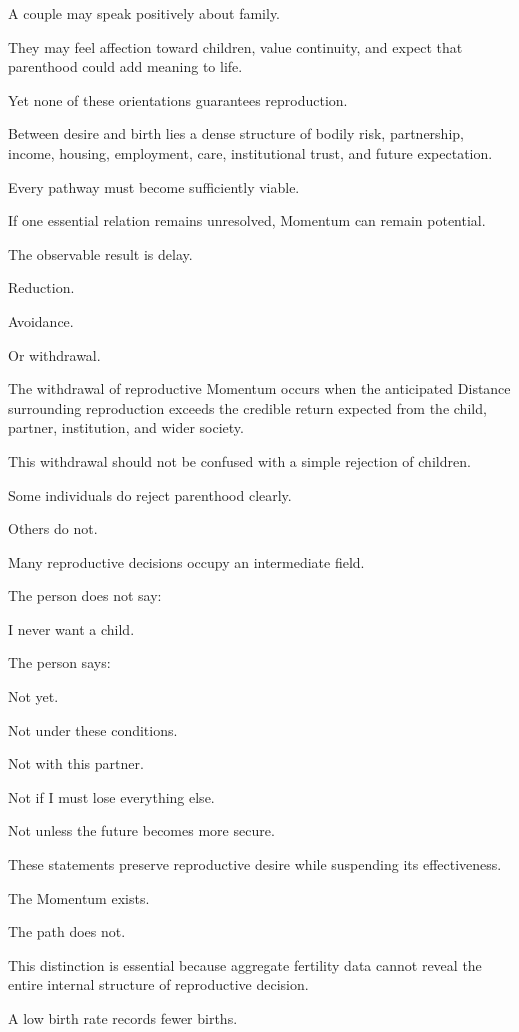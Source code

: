 A couple may speak positively about family.

They may feel affection toward children, value continuity, and expect that parenthood could add meaning to life.

Yet none of these orientations guarantees reproduction.

Between desire and birth lies a dense structure of bodily risk, partnership, income, housing, employment, care, institutional trust, and future expectation.

Every pathway must become sufficiently viable.

If one essential relation remains unresolved, Momentum can remain potential.

The observable result is delay.

Reduction.

Avoidance.

Or withdrawal.

The withdrawal of reproductive Momentum occurs when the anticipated Distance surrounding reproduction exceeds the credible return expected from the child, partner, institution, and wider society.

This withdrawal should not be confused with a simple rejection of children.

Some individuals do reject parenthood clearly.

Others do not.

Many reproductive decisions occupy an intermediate field.

The person does not say:

I never want a child.

The person says:

Not yet.

Not under these conditions.

Not with this partner.

Not if I must lose everything else.

Not unless the future becomes more secure.

These statements preserve reproductive desire while suspending its effectiveness.

The Momentum exists.

The path does not.

This distinction is essential because aggregate fertility data cannot reveal the entire internal structure of reproductive decision.

A low birth rate records fewer births.


